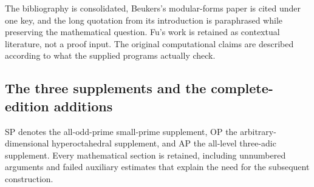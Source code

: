 \documentclass[11pt,a4paper]{article}
\theoremstyle{definition}\newtheorem{definition}[theorem]{Definition}
\theoremstyle{remark}\newtheorem{remark}[theorem]{Remark}
\numberwithin{equation}{section}
\begin{document}
The bibliography is consolidated, Beukers's modular-forms paper is cited under one key, and the long quotation from its introduction is paraphrased while preserving the mathematical question. Fu's work is retained as contextual literature, not a proof input. The original computational claims are described according to what the supplied programs actually check.

\clearpage

\subsection{The three supplements and the complete-edition additions}
SP denotes the all-odd-prime small-prime supplement, OP the
arbitrary-dimensional hyperoctahedral supplement, and AP the
all-level three-adic supplement. Every mathematical section is retained,
including unnumbered arguments and failed auxiliary estimates that
explain the need for the subsequent construction.
\end{document}
